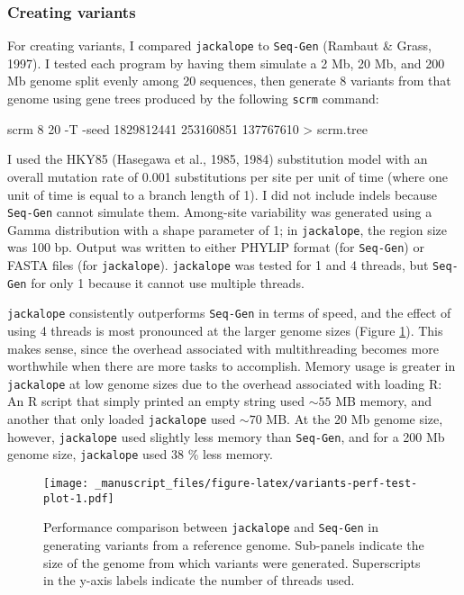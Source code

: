 \documentclass[12pt,]{article}
\newenvironment{Shaded}{}{}
\newcommand{\ExtensionTok}[1]{#1}
\newcommand{\NormalTok}[1]{#1}
\newcommand{\OperatorTok}[1]{#1}
\begin{document}
\hypertarget{creating-variants-1}{%
\subsubsection{Creating variants}\label{creating-variants-1}}

For creating variants, I compared \texttt{jackalope} to \texttt{Seq-Gen}
(Rambaut \& Grass, 1997).
I tested each program by having them simulate a 2 Mb, 20 Mb, and 200 Mb genome
split evenly among 20 sequences, then generate 8 variants from that genome using
gene trees produced by the following \texttt{scrm} command:

\begin{Shaded}
\begin{Highlighting}[]
\ExtensionTok{scrm}\NormalTok{ 8 20 -T -seed 1829812441 253160851 137767610 }\OperatorTok{>}\NormalTok{ scrm.tree}
\end{Highlighting}
\end{Shaded}

I used the HKY85 (Hasegawa et al., 1985, 1984) substitution model
with an overall mutation rate of 0.001 substitutions per site per unit of time
(where one unit of time is equal to a branch length of 1).
I did not include indels because \texttt{Seq-Gen} cannot simulate them.
Among-site variability was generated using a Gamma distribution with a shape
parameter of 1; in \texttt{jackalope}, the region size was 100 bp.
Output was written to either PHYLIP format (for \texttt{Seq-Gen}) or
FASTA files (for \texttt{jackalope}).
\texttt{jackalope} was tested for 1 and 4 threads, but
\texttt{Seq-Gen} for only 1 because it cannot use multiple threads.

\texttt{jackalope} consistently outperforms \texttt{Seq-Gen} in terms of speed, and the effect
of using 4 threads is most pronounced at the larger genome sizes
(Figure \ref{fig:variants-perf-test-plot}).
This makes sense, since the overhead associated with multithreading becomes more
worthwhile when there are more tasks to accomplish.
Memory usage is greater in \texttt{jackalope} at low genome sizes due to the overhead
associated with loading R:
An R script that simply printed an empty string used \(\sim 55\) MB memory,
and another that only loaded \texttt{jackalope} used \(\sim 70\) MB.
At the 20 Mb genome size, however, \texttt{jackalope} used slightly less memory than \texttt{Seq-Gen},
and for a 200 Mb genome size, \texttt{jackalope} used 38 \% less memory.

\begin{figure}
\centering
\texttt{[image: \_manuscript\_files/figure-latex/variants-perf-test-plot-1.pdf]}
\caption{\label{fig:variants-perf-test-plot}Performance comparison between \texttt{jackalope} and \texttt{Seq-Gen} in generating variants from a reference genome. Sub-panels indicate the size of the genome from which variants were generated. Superscripts in the y-axis labels indicate the number of threads used.}
\end{figure}
\end{document}
